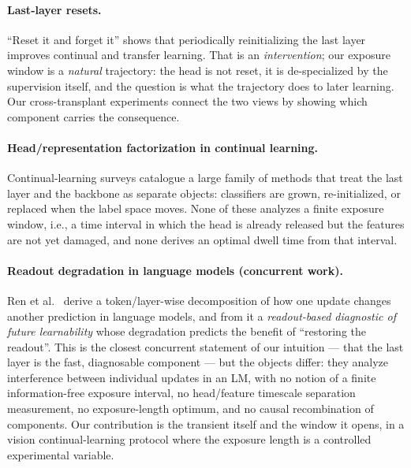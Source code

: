 \documentclass[review,12pt]{elsarticle}
\begin{document}
\paragraph{Last-layer resets.}
``Reset it and forget it'' \cite{faia2024reset} shows that periodically
reinitializing the last layer improves continual and transfer learning. That is
an \emph{intervention}; our exposure window is a \emph{natural} trajectory: the
head is not reset, it is de-specialized by the supervision itself, and the
question is what the trajectory does to later learning. Our cross-transplant
experiments connect the two views by showing which component carries the
consequence.

\paragraph{Head/representation factorization in continual learning.}
Continual-learning surveys \cite{delange2021survey} catalogue a large family
of methods that treat the last layer and the backbone as separate objects:
classifiers are grown, re-initialized, or replaced when the label space moves.
None of these analyzes a finite exposure window, i.e., a time interval in which
the head is already released but the features are not yet damaged, and none
derives an optimal dwell time from that interval.

\paragraph{Readout degradation in language models (concurrent work).}
Ren et al.~\cite{ren2026learning} derive a token/layer-wise decomposition of
how one update changes another prediction in language models, and from it a
\emph{readout-based diagnostic of future learnability} whose degradation
predicts the benefit of ``restoring the readout''. This is the closest
concurrent statement of our intuition --- that the last layer is the fast,
diagnosable component --- but the objects differ: they analyze interference
between individual updates in an LM, with no notion of a finite
information-free exposure interval, no head/feature timescale separation
measurement, no exposure-length optimum, and no causal recombination of
components. Our contribution is the transient itself and the window it opens,
in a vision continual-learning protocol where the exposure length is a
controlled experimental variable.
\end{document}
